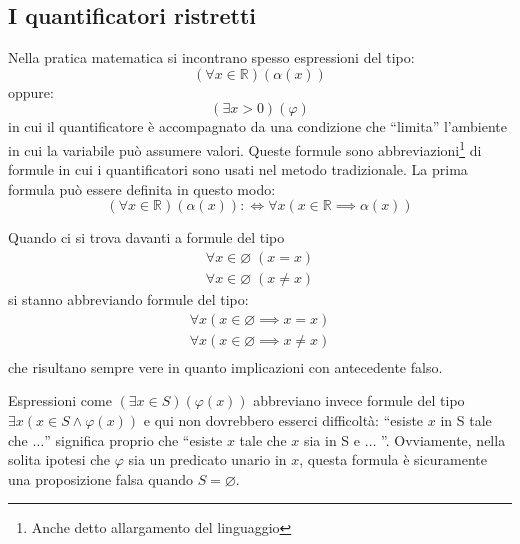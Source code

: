 \subsection{I quantificatori ristretti}
Nella pratica matematica si incontrano spesso espressioni del tipo:
\[
(\forall x \in \mathbb{R})(\alpha(x))
\]
oppure:
\[
(\exists x>0)(\varphi)
\]
in cui il quantificatore è accompagnato da una condizione che ``limita'' l'ambiente in cui la variabile può assumere valori. Queste formule sono abbreviazioni\footnote{Anche detto allargamento del linguaggio} di formule in cui i quantificatori sono usati nel metodo tradizionale. La prima formula può essere definita in questo modo:
\[
(\forall x \in \mathbb{R})(\alpha(x)) : \iff \forall x (x \in \mathbb{R} \implies \alpha(x))
\]
\begin{example}
	Quando ci si trova davanti a formule del tipo
	\[
	\begin{array}{lc}
		\forall x \in \varnothing \; (x = x) \\
		\forall x \in \varnothing \;(x \neq x)
	\end{array}
	\]
	si stanno abbreviando formule del tipo:
	\[
	\begin{array}{lc}
		\forall x( x \in \varnothing \implies x=x) \\
		\forall x(x \in \varnothing \implies x \neq x) \\
	\end{array}
	\]
	che risultano sempre vere in quanto implicazioni con antecedente falso.
\end{example}

Espressioni come $(\exists x \in S) (\varphi(x))$ abbreviano invece formule del tipo $\exists x (x \in S \land \varphi(x))$ e qui non dovrebbero esserci difficoltà: ``esiste $x$ in S tale che $\ldots$'' significa proprio che ``esiste $x$ tale che $x$ sia in S e $\ldots$ ''. Ovviamente, nella solita ipotesi che $\varphi$ sia un predicato unario in $x$, questa formula è sicuramente una proposizione falsa quando $S = \varnothing$.

